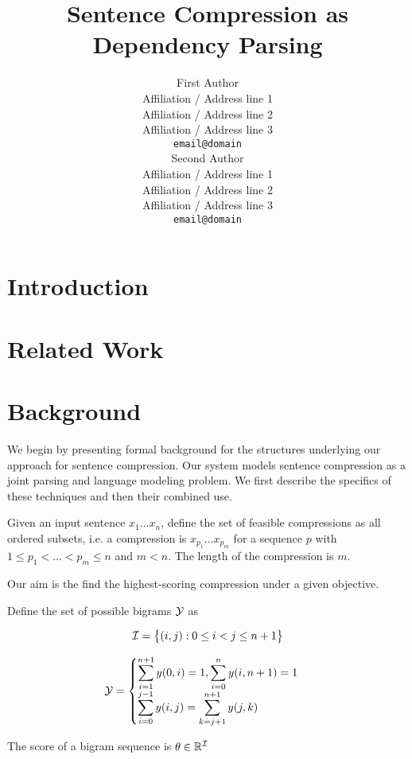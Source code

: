 \documentclass[11pt]{article}
\title{Sentence Compression as Dependency Parsing}
\author{First Author \\
  Affiliation / Address line 1 \\
  Affiliation / Address line 2 \\
  Affiliation / Address line 3 \\
  {\tt email@domain} \\\And
  Second Author \\
  Affiliation / Address line 1 \\
  Affiliation / Address line 2 \\
  Affiliation / Address line 3 \\
  {\tt email@domain} \\}
\date{}
\newcommand{\Set}[1]{\big\{ #1 \big\}}
\newcommand{\Reals}{\mathbb{R}}
\newcommand{\IndexSet}{{\cal I}}
\begin{document}
\maketitle
\begin{abstract}
\end{abstract}

\section{Introduction}

\section{Related Work}


\cite{eisner99dp}

\cite{huang2005machine}

\section{Background}
We begin by presenting formal background for the structures underlying
our approach for sentence compression. Our system models sentence
compression as a joint parsing and language modeling problem. We first
describe the specifics of these techniques and then their combined use.  

Given an input sentence $x_1 \ldots x_n$, define the set of feasible
compressions as all ordered subsets, i.e. a compression is $x_{p_1} \ldots x_{p_m}$ for a sequence $p$ with
$1 \leq p_1 < \ldots < p_m \leq n$ and $m < n$. The length of the compression is $m$.

Our aim is the find the highest-scoring compression under a given
objective.


Define the set of possible bigrams ${\cal Y}$ as

\[ \IndexSet = \Set{(i,j) : 0 \leq i < j \leq n+1} \]

\begin{equation*}
  {\cal Y} = \begin{cases}\displaystyle
    \sum_{i=1}^{n+1} y(0, i) = 1, \sum_{i=0}^n y(i, n+1) = 1 \\\displaystyle
    \sum_{i=0}^{j-1} y(i,j) = \sum_{k=j+1}^{n+1} y(j, k)\end{cases}
\end{equation*}

The score of a bigram sequence is $\theta \in \Reals^{\IndexSet}$  
\end{document}
